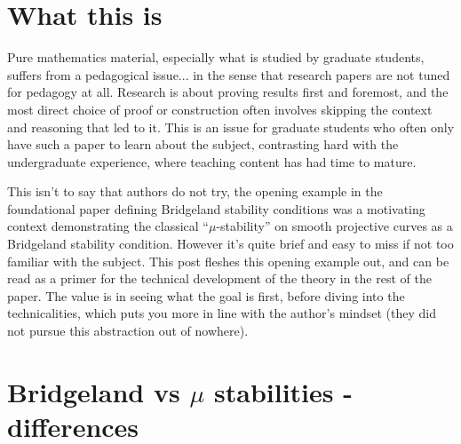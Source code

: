 \documentclass[]{article}
\begin{document}

\maketitle
\tableofcontents

\section{What this is}

Pure mathematics material, especially what is studied by graduate students, suffers from a pedagogical issue...
in the sense that research papers are not tuned for pedagogy at all.
Research is about proving results first and foremost, and the most direct choice of proof or construction often
involves skipping the context and reasoning that led to it.
This is an issue for graduate students who often only have such a paper to learn about the subject,
contrasting hard with the undergraduate experience, where teaching content has had time to mature.

This isn't to say that authors do not try, the opening example in the foundational paper defining Bridgeland
stability conditions \cite{bridgeland2006stabilityconditionstriangulatedcategories} was a motivating context
demonstrating the classical ``$\mu$-stability'' on smooth projective curves as a Bridgeland stability condition.
However it's quite brief and easy to miss if not too familiar with the subject.
This post fleshes this opening example out, and can be read as a primer for the technical development of the
theory in the rest of the paper.
The value is in seeing what the goal is first, before diving into the technicalities,
which puts you more in line with the author's mindset
(they did not pursue this abstraction out of nowhere).

\section{Bridgeland vs $\mu$ stabilities - differences}


\printbibliography
\end{document}
